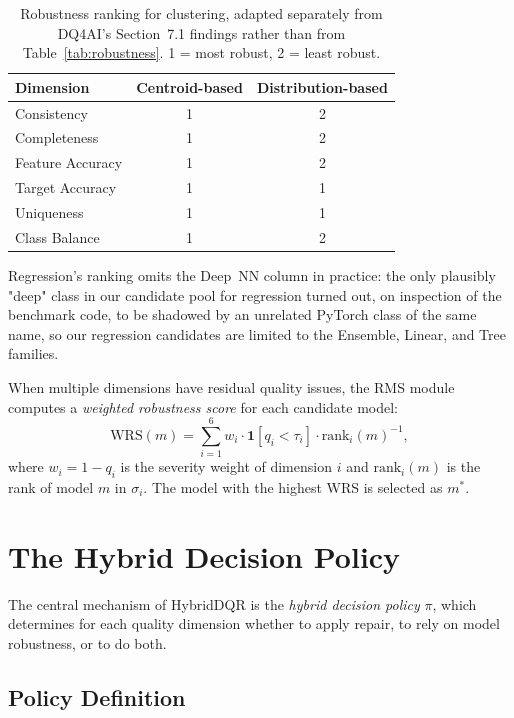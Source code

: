 \documentclass[runningheads]{llncs}
\begin{document}
\begin{table}[t]
\centering
\caption{Robustness ranking for clustering, adapted separately
from DQ4AI's Section~7.1 findings rather than from
Table~\ref{tab:robustness}. 1 = most robust, 2 = least robust.}
\label{tab:robustness-clustering}
\small
\begin{tabular}{@{}lcc@{}}
\toprule
\textbf{Dimension} & \textbf{Centroid-based} & \textbf{Distribution-based} \\
\midrule
Consistency        & 1 & 2 \\
Completeness       & 1 & 2 \\
Feature Accuracy   & 1 & 2 \\
Target Accuracy    & 1 & 1 \\
Uniqueness         & 1 & 1 \\
Class Balance      & 1 & 2 \\
\bottomrule
\end{tabular}
\end{table}

Regression's ranking omits the Deep~NN column in practice: the
only plausibly "deep" class in our candidate pool for regression
turned out, on inspection of the benchmark code, to be shadowed
by an unrelated PyTorch class of the same name, so our regression
candidates are limited to the Ensemble, Linear, and Tree families.

When multiple dimensions have residual quality issues, the RMS
module computes a \emph{weighted robustness score} for each
candidate model:
\begin{equation}
  \text{WRS}(m) = \sum_{i=1}^{6}
  w_i \cdot \mathbf{1}[q_i < \tau_i] \cdot \text{rank}_i(m)^{-1},
\end{equation}
where $w_i = 1 - q_i$ is the severity weight of dimension $i$
and $\text{rank}_i(m)$ is the rank of model $m$ in $\sigma_i$.
The model with the highest WRS is selected as $m^*$.

\section{The Hybrid Decision Policy}
\label{sec:policy}

The central mechanism of HybridDQR is the \emph{hybrid decision
policy} $\pi$, which determines for each quality dimension
whether to apply repair, to rely on model robustness, or to do both.

\subsection{Policy Definition}
\end{document}
